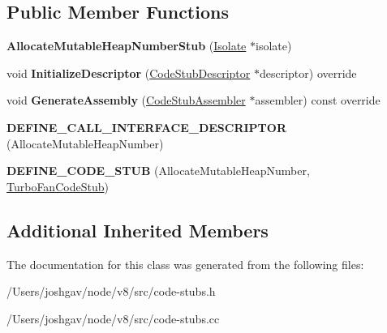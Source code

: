 \subsection*{Public Member Functions}
\begin{DoxyCompactItemize}
\item 
{\bfseries Allocate\+Mutable\+Heap\+Number\+Stub} (\hyperlink{classv8_1_1internal_1_1_isolate}{Isolate} $\ast$isolate)\hypertarget{classv8_1_1internal_1_1_allocate_mutable_heap_number_stub_a5b61c3eec69b2050e51bef42d5dad1ff}{}\label{classv8_1_1internal_1_1_allocate_mutable_heap_number_stub_a5b61c3eec69b2050e51bef42d5dad1ff}

\item 
void {\bfseries Initialize\+Descriptor} (\hyperlink{classv8_1_1internal_1_1_code_stub_descriptor}{Code\+Stub\+Descriptor} $\ast$descriptor) override\hypertarget{classv8_1_1internal_1_1_allocate_mutable_heap_number_stub_ada6a404574d7fc9cb9001f680ff5c770}{}\label{classv8_1_1internal_1_1_allocate_mutable_heap_number_stub_ada6a404574d7fc9cb9001f680ff5c770}

\item 
void {\bfseries Generate\+Assembly} (\hyperlink{classv8_1_1internal_1_1_code_stub_assembler}{Code\+Stub\+Assembler} $\ast$assembler) const  override\hypertarget{classv8_1_1internal_1_1_allocate_mutable_heap_number_stub_ae0f29e99bd8459ca3810d22feb0e77f8}{}\label{classv8_1_1internal_1_1_allocate_mutable_heap_number_stub_ae0f29e99bd8459ca3810d22feb0e77f8}

\item 
{\bfseries D\+E\+F\+I\+N\+E\+\_\+\+C\+A\+L\+L\+\_\+\+I\+N\+T\+E\+R\+F\+A\+C\+E\+\_\+\+D\+E\+S\+C\+R\+I\+P\+T\+OR} (Allocate\+Mutable\+Heap\+Number)\hypertarget{classv8_1_1internal_1_1_allocate_mutable_heap_number_stub_a75d00c69f9e30178442f27929efe37a8}{}\label{classv8_1_1internal_1_1_allocate_mutable_heap_number_stub_a75d00c69f9e30178442f27929efe37a8}

\item 
{\bfseries D\+E\+F\+I\+N\+E\+\_\+\+C\+O\+D\+E\+\_\+\+S\+T\+UB} (Allocate\+Mutable\+Heap\+Number, \hyperlink{classv8_1_1internal_1_1_turbo_fan_code_stub}{Turbo\+Fan\+Code\+Stub})\hypertarget{classv8_1_1internal_1_1_allocate_mutable_heap_number_stub_af4ffe2405d8d5e12b92a3206c3b65a3a}{}\label{classv8_1_1internal_1_1_allocate_mutable_heap_number_stub_af4ffe2405d8d5e12b92a3206c3b65a3a}

\end{DoxyCompactItemize}
\subsection*{Additional Inherited Members}


The documentation for this class was generated from the following files\+:\begin{DoxyCompactItemize}
\item 
/\+Users/joshgav/node/v8/src/code-\/stubs.\+h\item 
/\+Users/joshgav/node/v8/src/code-\/stubs.\+cc\end{DoxyCompactItemize}
